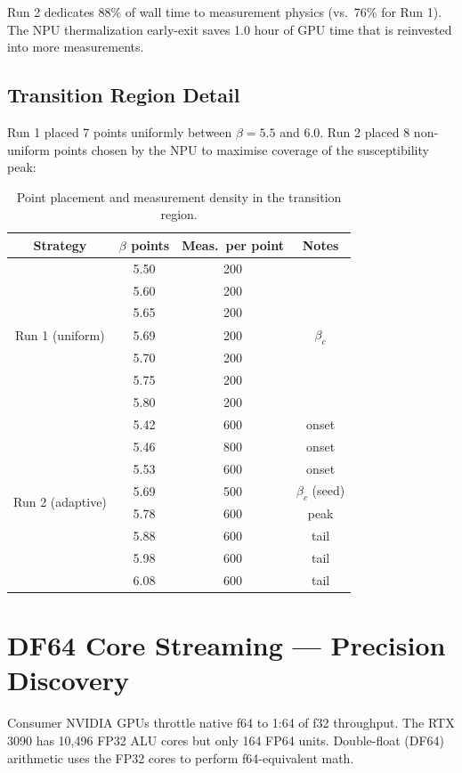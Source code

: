 \documentclass[11pt,a4paper]{article}
\newcommand{\btc}{\beta_c}
\begin{document}
Run 2 dedicates 88\% of wall time to measurement physics (vs.\ 76\% for
Run 1).  The NPU thermalization early-exit saves 1.0 hour of GPU time that is
reinvested into more measurements.

\subsection{Transition Region Detail}

Run 1 placed 7 points uniformly between $\beta = 5.5$ and $6.0$.  Run 2
placed 8 non-uniform points chosen by the NPU to maximise coverage of the
susceptibility peak:

\begin{table}[H]
\centering
\caption{Point placement and measurement density in the transition region.}
\label{tab:placement}
\renewcommand{\arraystretch}{1.25}
\begin{tabular}{cccc}
\toprule
Strategy & $\beta$ points & Meas.\ per point & Notes \\
\midrule
\multirow{7}{*}{Run 1 (uniform)}
  & 5.50 & 200 & \\
  & 5.60 & 200 & \\
  & 5.65 & 200 & \\
  & 5.69 & 200 & $\btc$ \\
  & 5.70 & 200 & \\
  & 5.75 & 200 & \\
  & 5.80 & 200 & \\
\midrule
\multirow{8}{*}{Run 2 (adaptive)}
  & 5.42 & 600 & onset \\
  & 5.46 & 800 & onset \\
  & 5.53 & 600 & onset \\
  & 5.69 & 500 & $\btc$ (seed) \\
  & 5.78 & 600 & peak \\
  & 5.88 & 600 & tail \\
  & 5.98 & 600 & tail \\
  & 6.08 & 600 & tail \\
\bottomrule
\end{tabular}
\end{table}

\FloatBarrier
\section{DF64 Core Streaming --- Precision Discovery}

Consumer NVIDIA GPUs throttle native f64 to 1:64 of f32 throughput.  The RTX
3090 has 10,496 FP32 ALU cores but only 164 FP64 units.  Double-float (DF64)
arithmetic \cite{Dekker1971} uses the FP32 cores to perform f64-equivalent
math.
\end{document}
